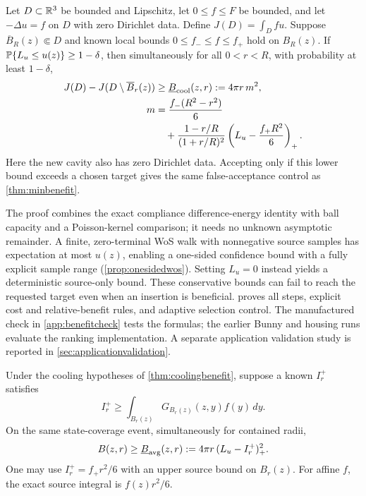 \begin{theorem}
\label{thm:coolingbenefit}
Let $D\subset\mathbb{R}^3$ be bounded and Lipschitz, let $0\le f\le F$ be bounded,
and let $-\Delta u=f$ on $D$ with zero Dirichlet data. Define
$J(D)=\int_Dfu$. Suppose $\overline B_R(z)\Subset D$ and known local bounds
$0\le f_-\le f\le f_+$ hold on $B_R(z)$. If
$\mathbb{P}\{L_u\le u(z)\}\ge1-\delta$, then simultaneously for all $0<r<R$,
with probability at least $1-\delta$,
\begin{equation}
 \begin{split}
 J(D)-J(D\setminus\overline B_r(z))
 &\ge\underline B_{\rm cool}(z,r):=4\pi r\,m^2,\\
 m&=\frac{f_-(R^2-r^2)}6\\
 &\quad+\frac{1-r/R}{(1+r/R)^2}
       \left(L_u-\frac{f_+R^2}6\right)_+.
 \end{split}
 \label{eq:directcoolingbenefit}
\end{equation}
Here the new cavity also has zero Dirichlet data. Accepting only if this
lower bound exceeds a chosen target gives the same false-acceptance control
as \cref{thm:minbenefit}.
\end{theorem}

The proof combines the exact compliance difference-energy identity with
ball capacity and a Poisson-kernel comparison; it needs no unknown
asymptotic remainder. A finite, zero-terminal WoS walk with nonnegative
source samples has expectation at most $u(z)$, enabling a one-sided
confidence bound with a fully explicit sample range
(\cref{prop:onesidedwos}). Setting $L_u=0$ instead yields a deterministic
source-only bound. These conservative bounds can fail to reach the requested
target even when an insertion is beneficial.  proves
all steps, explicit cost and relative-benefit rules, and adaptive selection
control. The manufactured check in \cref{app:benefitcheck} tests the formulas;
the earlier Bunny and housing runs evaluate the ranking implementation. A separate application validation study is reported in \cref{sec:applicationvalidation}.

\begin{theorem}
\label{thm:averagecertificate}
Under the cooling hypotheses of \cref{thm:coolingbenefit}, suppose a known $I_r^+$ satisfies
\[
 I_r^+\ge\int_{B_r(z)}G_{B_r(z)}(z,y)f(y)\,dy.
\]
On the same
state-coverage event, simultaneously for contained radii,
\begin{equation}
 B(z,r)\ge\underline B_{\rm avg}(z,r)
 :=4\pi r\,(L_u-I_r^+)_+^2.
 \label{eq:averagecertificate}
\end{equation}
One may use $I_r^+=f_+r^2/6$ with an upper source bound on $B_r(z)$.
For affine $f$, the exact source integral is $f(z)r^2/6$.
\end{theorem}

